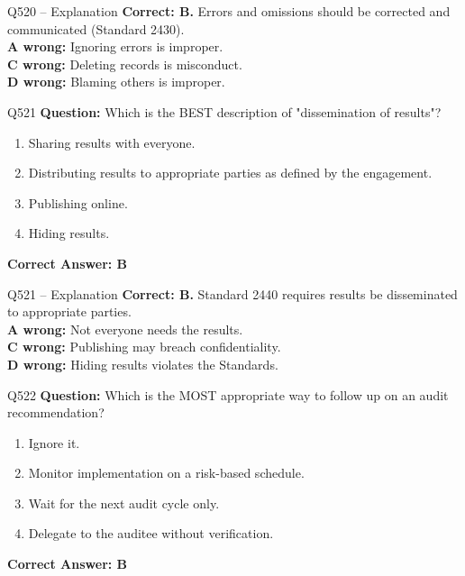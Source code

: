 \documentclass[aspectratio=169,10pt]{beamer}
\begin{document}
	\begin{frame}[t]{Q520 -- Explanation}
		\small
		\textbf{Correct: B.} Errors and omissions should be corrected and communicated (Standard 2430). \\[4pt]
		\textbf{A wrong:} Ignoring errors is improper. \\[2pt]
		\textbf{C wrong:} Deleting records is misconduct. \\[2pt]
		\textbf{D wrong:} Blaming others is improper.
	\end{frame}
	
	\begin{frame}[t]{Q521}
		\small
		\textbf{Question:} Which is the BEST description of "dissemination of results"?
		\begin{enumerate}[label=\Alph*.,itemsep=1pt,topsep=2pt]
			\item Sharing results with everyone.
			\item Distributing results to appropriate parties as defined by the engagement.
			\item Publishing online.
			\item Hiding results.
		\end{enumerate}
		\vspace{4pt}
		\textbf{Correct Answer: B}
	\end{frame}
	
	\begin{frame}[t]{Q521 -- Explanation}
		\small
		\textbf{Correct: B.} Standard 2440 requires results be disseminated to appropriate parties. \\[4pt]
		\textbf{A wrong:} Not everyone needs the results. \\[2pt]
		\textbf{C wrong:} Publishing may breach confidentiality. \\[2pt]
		\textbf{D wrong:} Hiding results violates the Standards.
	\end{frame}
	
	\begin{frame}[t]{Q522}
		\small
		\textbf{Question:} Which is the MOST appropriate way to follow up on an audit recommendation?
		\begin{enumerate}[label=\Alph*.,itemsep=1pt,topsep=2pt]
			\item Ignore it.
			\item Monitor implementation on a risk-based schedule.
			\item Wait for the next audit cycle only.
			\item Delegate to the auditee without verification.
		\end{enumerate}
		\vspace{4pt}
		\textbf{Correct Answer: B}
	\end{frame}
	
\end{document}
